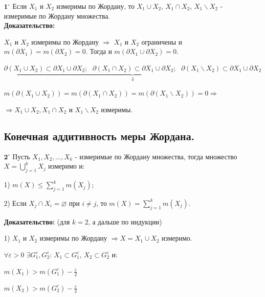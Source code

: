\documentclass[a4paper,12pt]{article} %
\begin{document}
	$\textbf{1}^\circ$ Если $X_1$ и $X_2$ измеримы по Жордану, то $X_1 \cup X_2$, $X_1 \cap X_2$, $X_1 \backslash X_2$ - измеримые по Жордану множества.\\
	
	\textbf{Доказательство:}
	
	$X_1$ и $X_2$ измеримы по Жордану $\Rightarrow$ $X_1$ и $X_2$ ограничены и $m(\partial X_1) = m(\partial X_2) = 0$. Тогда и $m(\partial X_1 \cup \partial X_2) = 0$.
	\vspace{3mm}
	
	\noindent $\underbrace{\partial (X_1 \cup X_2) \subset \partial X_1 \cup \partial X_2;\text{ } \partial (X_1 \cap X_2) \subset \partial X_1 \cup \partial X_2;\text{ } \partial (X_1 \backslash X_2) \subset \partial X_1 \cup \partial X_2}_{\Downarrow}$	
	
	$m(\partial (X_1 \cup X_2)) = m(\partial (X_1 \cap X_2)) = m(\partial (X_1 \backslash X_2)) = 0 \Rightarrow$
	
	\vspace{2mm}
	\noindent $\Rightarrow X_1 \cup X_2, X_1 \cap X_2$ и $ X_1 \backslash X_2$ измеримы.\\
	
	
	\subsection{Конечная аддитивность меры Жордана.}
	
	$\textbf{2}^\circ$ Пусть $X_1, X_2, \ldots, X_k$ - измеримые по Жордану множества, тогда множество $X = \bigcup\limits_{j = 1}^k X_j$ измеримо и:
	
	1) $m(X) \leqslant \sum\limits_{j = 1}^k m(X_j)$;
	
	2) Если $X_j \cap X_i = \varnothing$ при $i \neq j$, то $m(X) = \sum\limits_{j = 1}^k m(X_j)$.
	
	\textbf{Доказательство:} (для $k = 2$, а дальше по индукции)
	
	\vspace{2mm}
	
	1) $X_1$ и $X_2$ измеримы по Жордану $\Rightarrow X = X_1 \cup X_2$ измеримо.
	
	$\forall \varepsilon > 0$ $\exists G_1^{\varepsilon}, G_2^{\varepsilon}$: $X_1 \subset G_1^{\varepsilon}$, $X_2 \subset G_2^{\varepsilon}$ и: 
	
	$m(X_1) > m(G_1^{\varepsilon}) - \frac{\varepsilon}{2}$
	
	$m(X_2) > m(G_2^{\varepsilon}) - \frac{\varepsilon}{2}$
	
\end{document}
